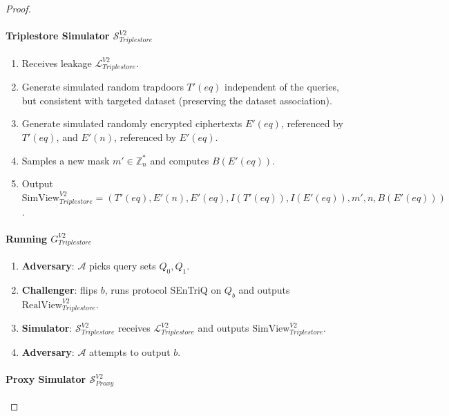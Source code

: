 \begin{proof} \hfill

    \paragraph{Triplestore Simulator $\mathcal{S}_{Triplestore}^{V2}$}

    \begin{enumerate}
        \item Receives leakage $\mathcal{L}_{Triplestore}^{V2}$.
        \item Generate simulated random trapdoors $T'(eq)$ independent of the queries, but consistent with targeted dataset (preserving the dataset association).
        \item Generate simulated randomly encrypted ciphertexts $E'(eq)$, referenced by  $T'(eq)$, and $E'(n)$, referenced by $E'(eq)$.
        \item Samples a new mask $m' \in \mathbb{Z}^*_n$ and computes $B(E'(eq))$.
        \item Output $\mathrm{SimView}_{Triplestore}^{V2} = ( T'(eq), E'(n), E'(eq), I(T'(eq)), I(E'(eq)), m', n, B(E'(eq)))$.
    \end{enumerate}

    \paragraph{Running $G^{V2}_{Triplestore}$}

    \begin{enumerate}
        \item \textbf{Adversary}: $\mathcal{A}$ picks query sets $Q_0, Q_1$.
        \item \textbf{Challenger}: flips $b$, runs protocol \gls{SEnTriQ} on $Q_b$ and outputs \linebreak$\mathrm{RealView}^{V2}_{Triplestore}$.
        \item \textbf{Simulator}: $\mathcal{S}_{Triplestore}^{V2}$ receives $\mathcal{L}_{Triplestore}^{V2}$ and outputs $\mathrm{SimView}_{Triplestore}^{V2}$.
        \item \textbf{Adversary}: $\mathcal{A}$ attempts to output $b$. 
    \end{enumerate}

    \paragraph{Proxy Simulator $\mathcal{S}_{Proxy}^{V2}$}


\end{proof}

